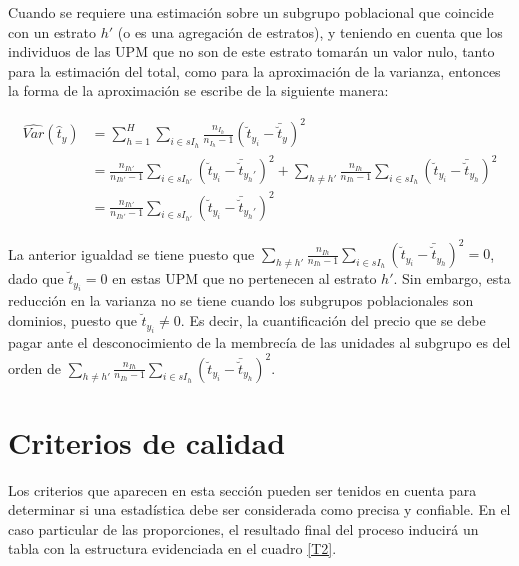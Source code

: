 \documentclass[
  12pt,
  spanish,
]{book}
\begin{document}
Cuando se requiere una estimación sobre un subgrupo poblacional que coincide con un estrato \(h'\) (o es una agregación de estratos), y teniendo en cuenta que los individuos de las UPM que no son de este estrato tomarán un valor nulo, tanto para la estimación del total, como para la aproximación de la varianza, entonces la forma de la aproximación se escribe de la siguiente manera:

\begin{align*}
\widehat{Var}(\hat{t}_y) &=
\sum_{h=1}^H \sum_{i \in sI_h}\frac{n_{I_h}}{n_{I_h}-1}\left( \breve{t}_{y_i} - \bar{\breve{t}}_{y} \right)^2\\
&=
\frac{n_{Ih'}}{n_{Ih'} -1}\sum_{i \in   sI_{h'}}\left( \breve{t}_{y_i} - \bar{\breve{t}}_{y_h'} \right)^2 + \sum_{h \neq h'} \frac{n_{Ih}}{n_{Ih} -1}\sum_{i \in   sI_h}\left( \breve{t}_{y_i} - \bar{\breve{t}}_{y_h} \right)^2\\
&=\frac{n_{Ih'}}{n_{Ih'} -1}\sum_{i \in   sI_{h'}}\left( \breve{t}_{y_i} - \bar{\breve{t}}_{y_h'} \right)^2
\end{align*}

La anterior igualdad se tiene puesto que \(\sum_{h \neq h'} \frac{n_{Ih}}{n_{Ih} -1}\sum_{i \in sI_h}\left( \breve{t}_{y_i} - \bar{\breve{t}}_{y_h} \right)^2=0\), dado que \(\breve{t}_{y_i} =0\) en estas UPM que no pertenecen al estrato \(h'\). Sin embargo, esta reducción en la varianza no se tiene cuando los subgrupos poblacionales son dominios, puesto que \(\breve{t}_{y_i} \neq 0\). Es decir, la cuantificación del precio que se debe pagar ante el desconocimiento de la membrecía de las unidades al subgrupo es del orden de \(\sum_{h \neq h'} \frac{n_{Ih}}{n_{Ih} -1}\sum_{i \in sI_h}\left( \breve{t}_{y_i} - \bar{\breve{t}}_{y_h} \right)^2\).

\hypertarget{criterios-de-calidad}{%
\section{Criterios de calidad}\label{criterios-de-calidad}}

Los criterios que aparecen en esta sección pueden ser tenidos en cuenta para determinar si una estadística debe ser considerada como precisa y confiable. En el caso particular de las proporciones, el resultado final del proceso inducirá un tabla con la estructura evidenciada en el cuadro \ref{T2}.

\footnotesize
\end{document}

